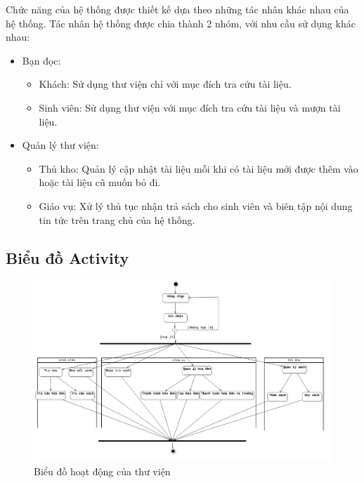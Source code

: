 \documentclass[12pt]{report}
\begin{document}
Chức năng của hệ thống được thiết kế dựa theo những tác nhân khác nhau của hệ thống. 
Tác nhân hệ thống được chia thành 2 nhóm, với nhu cầu sử dụng khác nhau: 
\begin{itemize}
    \item Bạn đọc:
        \begin{itemize}
            \item Khách: Sử dụng thư viện chỉ với mục đích tra cứu tài liệu. 
            \item Sinh viên: Sử dụng thư viện với mục đích tra cứu tài liệu và mượn tài liệu. 
        \end{itemize}
    \item Quản lý thư viện: 
        \begin{itemize}
            \item Thủ kho: Quản lý cập nhật tài liệu mỗi khi có tài liệu mới được thêm vào hoặc tài liệu cũ muốn bỏ đi. 
            \item Giáo vụ: Xử lý thủ tục nhận trả sách cho sinh viên và biên tập nội dung tin tức trên trang chủ của hệ thống. 
        \end{itemize}
\end{itemize}

\subsection{Biểu đồ Activity}
\begin{figure}[H]
\centering
\includegraphics[width=\textwidth]{figures/active.png}
\caption{Biểu đồ hoạt động của thư viện}
\end{figure}
\end{document}
